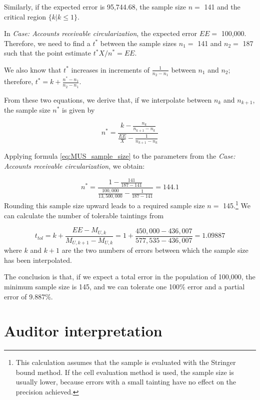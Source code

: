 Similarly, if the expected error is 95,744.68, the sample size $n =$ 141 and the critical region $\{k | k \leq 1\}$. 

In \emph{Case: Accounts receivable circularization}, the expected error $EE =$ 100,000. Therefore, we need to find a $t^*$ between the sample sizes $n_1 =$ 141 and $n_2 =$ 187 such that the point estimate $t^* X / n^* = EE$.

We also know that $t^*$ increases in increments of $\frac{1}{n_2 - n_1}$ between $n_1$ and $n_2$; therefore, $t^* = k + \frac{n^* - n_1}{n_2 - n_1}$.

From these two equations, we derive that, if we interpolate between $n_k$ and $n_{k + 1}$, the sample size $n^*$ is given by

\begin{equation}
n^* = \frac{k - \frac{n_k}{n_{k + 1} - n_k}}{\frac{EE}{X} - \frac{1}{n_{k + 1} - n_{k}}}
\label{eq:MUS_sample_size}
\end{equation}

Applying formula \ref{eq:MUS_sample_size} to the parameters from the \emph{Case: Accounts receivable circularization}, we obtain:

\begin{equation*}
n^* = \frac{1 - \frac{141}{187 - 141}}{\frac{100,000}{13,500,000} - \frac{1}{187 - 141}} = 144.1
\end{equation*}
Rounding this sample size upward leads to a required sample size $n =$ 145.\footnote{This calculation assumes that the sample is evaluated with the Stringer bound method. If the cell evaluation method is used, the sample size is usually lower, because errors with a small tainting have no effect on the precision achieved.} We can calculate the number of tolerable taintings from

\begin{equation*}
t_{tol} = k + \frac{EE - M_{U, k}}{M_{U, k+1} - M_{U, k}} = 1 + \frac{450,000 - 436,007}{577,535 - 436,007} = 1.09887
\end{equation*}
where $k$ and $k+1$ are the two numbers of errors between which the sample size has been interpolated.

The conclusion is that, if we expect a total error in the population of 100,000, the minimum sample size is 145, and we can tolerate one 100\% error and a partial error of 9.887\%.


\section{Auditor interpretation} %
\label{sec:auditor_interpretation}

